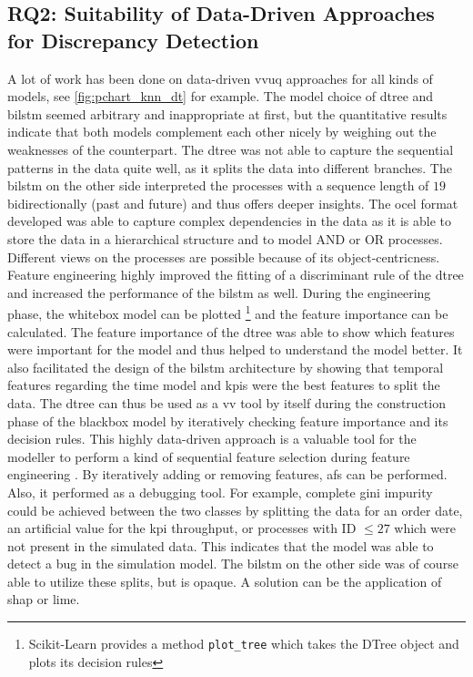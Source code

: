 \subsection{RQ2: Suitability of Data-Driven Approaches for Discrepancy Detection}
\label{sec:discussion_rq2}
A lot of work has been done on data-driven \gls{vvuq} approaches for all kinds of models, see \autoref{fig:pchart_knn_dt} for example. The model choice of \gls{dtree} and \gls{bilstm} seemed arbitrary and inappropriate at first, but the quantitative results indicate that both models complement each other nicely by weighing out the weaknesses of the counterpart. The \gls{dtree} was not able to capture the sequential patterns in the data quite well, as it splits the data into different branches. The \gls{bilstm} on the other side interpreted the processes with a sequence length of $19$ bidirectionally (past and future) and thus offers deeper insights. The \gls{ocel} format developed was able to capture complex dependencies in the data as it is able to store the data in a hierarchical structure and to model AND or OR processes. Different views on the processes are possible because of its object-centricness. Feature engineering highly improved the fitting of a discriminant rule of the \gls{dtree} and increased the performance of the \gls{bilstm} as well. During the engineering phase, the whitebox model can be plotted \footnote{Scikit-Learn provides a method \texttt{plot\_tree} which takes the DTree object and plots its decision rules} and the feature importance can be calculated. The feature importance of the \gls{dtree} was able to show which features were important for the model and thus helped to understand the model better. It also facilitated the design of the \gls{bilstm} architecture by showing that temporal features regarding the time model and \gls{kpi}s were the best features to split the data. The \gls{dtree} can thus be used as a \gls{vv} tool by itself during the construction phase of the blackbox model by iteratively checking feature importance and its decision rules. This highly data-driven approach is a valuable tool for the modeller to perform a kind of sequential feature selection during feature engineering \autocite{pudil1994floating}. By iteratively adding or removing features, \gls{afs} can be performed. Also, it performed as a debugging tool. For example, complete gini impurity could be achieved between the two classes by splitting the data for an order date, an artificial value for the \gls{kpi} throughput, or processes with ID $\le 27$ which were not present in the simulated data. This indicates that the model was able to detect a bug in the simulation model. The \gls{bilstm} on the other side was of course able to utilize these splits, but is opaque. A solution can be the application of \gls{shap} or \gls{lime}.

